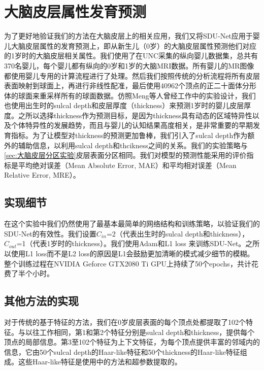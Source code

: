 
\section{大脑皮层属性发育预测}\label{sec:大脑皮层属性发育预测}
为了更好地验证我们的方法在大脑皮层上的相关应用，我们又将SDU-Net应用于婴儿大脑皮层属性的发育预测上，即从新生儿（0岁）的大脑皮层属性预测他们对应的1岁时的大脑皮层相关属性。我们使用了在UNC采集的纵向婴儿数据集，总共有370名婴儿，每个婴儿都有纵向的0岁和1岁的大脑MRI数据。所有婴儿的MR图像都使用婴儿专用的计算流程\cite{li2015construction}进行了处理。然后我们按照传统的分析流程将所有皮层表面映射到球面上，再进行非线性配准，最后使用40962个顶点的正二十面体分形体的球面来重采样所有的球面数据。仿照Meng等人\cite{meng2017can}曾经工作中的实验设计，我们也使用出生时的sulcal depth和皮层厚度（thickness）来预测1岁时的婴儿皮层厚度。之所以选择thickness作为预测目标，是因为thickness具有动态的区域特异性以及个体特异性的发展趋势，而且与婴儿的认知结果高度相关\cite{gilmore2018imaging}，是非常重要的早期发育指标。为了让模型对thickness的预测更加鲁棒，我们引入了sulcal depth作为额外的辅助信息，以利用sulcal depth和thcikness之间的关系\cite{li2015spatial}。我们的实验策略与
\ref{sec:大脑皮层分区实验}皮层表面分区相同。我们对模型的预测性能采用的评价指标是平均绝对误差（Mean Absolute Error, MAE）和平均相对误差（Mean Relative Error, MRE）。 

\subsection{实现细节}
在这个实验中我们仍然使用了最基本最简单的网络结构和训练策略，以验证我们的SDU-Net的有效性。我们设置$C_{in}$=2（代表出生时的sulcal depth和thickness），$C_{out}$=1（代表1岁时的thickness）。我们使用Adam和L1 loss 来训练SDU-Net。之所以使用L1 loss而不是L2 loss的原因是L1会鼓励更加清晰的模式减少细节的模糊\cite{isola2017image}。整个训练过程在NVIDIA Geforce GTX2080 Ti GPU上持续了50个epochs，共计花费了半个小时。

\subsection{其他方法的实现}
对于传统的基于特征的方法，我们在0岁皮层表面的每个顶点处都提取了102个特征。与以往工作\cite{meng2017can}相同，第1和第2个特征分别是sulcal depth和thickness，提供每个顶点的局部信息。第3至102个特征为上下文特征，为每个顶点提供丰富的邻域内的信息，它由50个sulcal depth的Haar-like特征和50个thickness的Haar-like特征组成。这些Haar-like特征是使用\cite{meng2017can}中的方法和超参数提取的。

